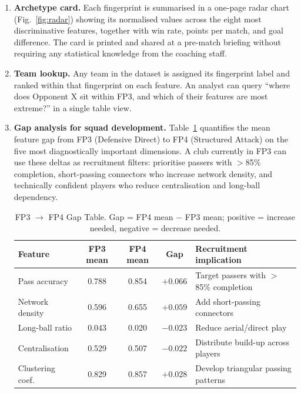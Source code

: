 \documentclass[runningheads]{llncs}
\begin{document}
\begin{enumerate}
    \item \textbf{Archetype card.} Each fingerprint is summarised in a one-page radar chart (Fig.~\ref{fig:radar}) showing its normalised values across the eight most discriminative features, together with win rate, points per match, and goal difference. The card is printed and shared at a pre-match briefing without requiring any statistical knowledge from the coaching staff.

    \item \textbf{Team lookup.} Any team in the dataset is assigned its fingerprint label and ranked within that fingerprint on each feature. An analyst can query ``where does Opponent X sit within FP3, and which of their features are most extreme?'' in a single table view.

    \item \textbf{Gap analysis for squad development.} Table~\ref{tab:gap} quantifies the mean feature gap from FP3 (Defensive Direct) to FP4 (Structured Attack) on the five most diagnostically important dimensions. A club currently in FP3 can use these deltas as recruitment filters: prioritise passers with $>$85\% completion, short-passing connectors who increase network density, and technically confident players who reduce centralisation and long-ball dependency.

\begin{table}[h]
\caption{FP3 $\to$ FP4 Gap Table. Gap = FP4 mean $-$ FP3 mean; positive = increase needed, negative = decrease needed.}\label{tab:gap}
\centering
\small
\begin{tabular}{|l|c|c|c|l|}
\hline
\textbf{Feature} & \textbf{FP3 mean} & \textbf{FP4 mean} & \textbf{Gap} & \textbf{Recruitment implication} \\
\hline
Pass accuracy      & 0.788 & 0.854 & $+0.066$ & Target passers with $>$85\% completion \\
Network density    & 0.596 & 0.655 & $+0.059$ & Add short-passing connectors \\
Long-ball ratio    & 0.043 & 0.020 & $-0.023$ & Reduce aerial/direct play \\
Centralisation     & 0.529 & 0.507 & $-0.022$ & Distribute build-up across players \\
Clustering coef.   & 0.829 & 0.857 & $+0.028$ & Develop triangular passing patterns \\
\hline
\end{tabular}
\end{table}


\end{enumerate}
\end{document}
